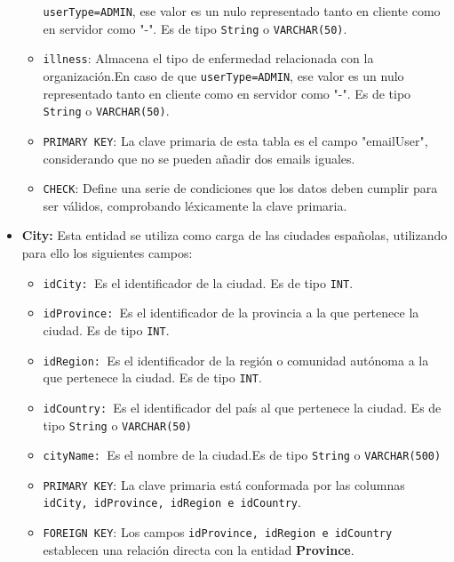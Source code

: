 \begin{itemize}
\begin{itemize}
        \texttt{userType=ADMIN}, ese valor es un nulo representado tanto en
        cliente como en servidor como "-". Es de tipo \texttt{String} o \texttt{VARCHAR(50)}.
        \item \texttt{illness}: Almacena el tipo de enfermedad relacionada con
        la organización.En caso de que
        \texttt{userType=ADMIN}, ese valor es un nulo representado tanto en
        cliente como en servidor como "-". Es de tipo \texttt{String} o \texttt{VARCHAR(50)}.
        \item \texttt{PRIMARY KEY}: La clave primaria de esta tabla es el campo "emailUser", considerando que no se pueden añadir dos emails iguales.
        \item \texttt{CHECK}: Define una serie de condiciones que los datos deben cumplir para ser válidos, comprobando léxicamente la clave primaria.
      \end{itemize}

      \item \textbf{City: }Esta entidad se utiliza como carga de las ciudades españolas, utilizando para ello los siguientes campos:
      \begin{itemize}
        \item \texttt{idCity: }Es el identificador de la ciudad. Es de tipo \texttt{INT}.
        \item \texttt{idProvince: }Es el identificador de la provincia a la que pertenece la ciudad. Es de tipo \texttt{INT}.
        \item \texttt{idRegion: }Es el identificador de la región o comunidad autónoma a la que pertenece la ciudad. Es de tipo \texttt{INT}.
        \item \texttt{idCountry: }Es el identificador del país al que pertenece la ciudad. Es de tipo \texttt{String} o \texttt{VARCHAR(50)}
        \item \texttt{cityName: }Es el nombre de la ciudad.Es de tipo \texttt{String} o \texttt{VARCHAR(500)}
        \item \texttt{PRIMARY KEY}: La clave primaria está conformada por las columnas \texttt{idCity, idProvince, idRegion e idCountry}.
        \item \texttt{FOREIGN KEY}: Los campos \texttt{idProvince, idRegion e idCountry} establecen una relación directa con la entidad \textbf{Province}.
      \end{itemize}
    

\end{itemize}
